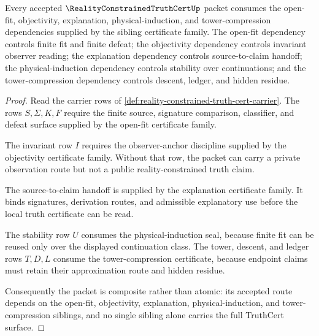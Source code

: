 \begin{theorem}
\label{thm:reality-constrained-truth-cert-sibling-dependency}
Every accepted $\RealityConstrainedTruthCertUp$ packet consumes the open-fit, objectivity, explanation, physical-induction, and tower-compression dependencies supplied by the sibling certificate family. The open-fit dependency controls finite fit and finite defeat; the objectivity dependency controls invariant observer reading; the explanation dependency controls source-to-claim handoff; the physical-induction dependency controls stability over continuations; and the tower-compression dependency controls descent, ledger, and hidden residue.
\end{theorem}
\begin{proof}
Read the carrier rows of \autoref{def:reality-constrained-truth-cert-carrier}. The rows $S,\Sigma,K,F$ require the finite source, signature comparison, classifier, and defeat surface supplied by the open-fit certificate family.

The invariant row $I$ requires the observer-anchor discipline supplied by the objectivity certificate family. Without that row, the packet can carry a private observation route but not a public reality-constrained truth claim.

The source-to-claim handoff is supplied by the explanation certificate family. It binds signatures, derivation routes, and admissible explanatory use before the local truth certificate can be read.

The stability row $U$ consumes the physical-induction seal, because finite fit can be reused only over the displayed continuation class. The tower, descent, and ledger rows $T,D,L$ consume the tower-compression certificate, because endpoint claims must retain their approximation route and hidden residue.

Consequently the packet is composite rather than atomic: its accepted route depends on the open-fit, objectivity, explanation, physical-induction, and tower-compression siblings, and no single sibling alone carries the full TruthCert surface.
\end{proof}

